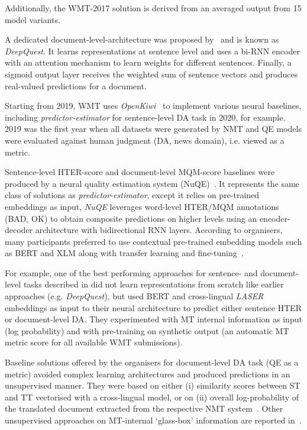 Additionally, the WMT-2017 solution is derived from an averaged output from 15 model variants.

A dedicated document-level-architecture was proposed by~\citet{Ive2018} and is known as \textit{DeepQuest}. It learns representations at sentence level and %
uses a bi-RNN encoder with an attention mechanism to learn weights for different sentences. Finally, a sigmoid output layer receives the weighted sum of sentence vectors and produces real-valued predictions for a document.

Starting from 2019, WMT uses \textit{OpenKiwi}~\cite{Kepler2019} to implement various neural baselines, including \textit{predictor-estimator} for sentence-level \gls{DA} task in 2020, for example. 
2019 was the first year when all datasets were generated by NMT and QE models were evaluated against human judgment (DA, news domain), i.e. viewed as a metric. 

Sentence-level HTER-score and document-level MQM-score baselines were produced by a neural quality estimation system (NuQE)~\cite{Martins2017}. It represents the same class of solutions as \textit{predictor-estimator}, except it relies on pre-trained embeddings as input, \textit{NuQE} leverages word-level HTER/MQM annotations (BAD, OK) to obtain composite predictions on higher levels using an encoder-decoder architecture with bidirectional RNN layers. 
According to organisers, many participants preferred to use contextual pre-trained embedding models such as BERT and XLM along with transfer learning and fine-tuning~\cite{Fonseca2019}.

For example, one of the best performing approaches for sentence- and document-level tasks described in \citet{Yankovskaya2019} did not learn representations from scratch like earlier approaches (e.g. \textit{DeepQuest}), but used \gls{BERT} and cross-lingual \textit{LASER} embeddings as input to their neural architecture to predict either sentence HTER or document-level DA. They experimented with MT internal information as input (log probability) and with pre-training on synthetic output (an automatic MT metric score for all available WMT submissions).

Baseline solutions offered by the organisers for document-level DA task (QE as a metric) avoided complex learning architectures and produced predictions in an unsupervised manner. They were based on either (i) similarity scores between ST and TT vectorised with a cross-lingual model, or on (ii)  overall log-probability of the translated document extracted from the respective NMT system~\cite{Fonseca2019}. Other unsupervised approaches on MT-internal `glass-box' information are reported in~\citet{Fomicheva2020}.

